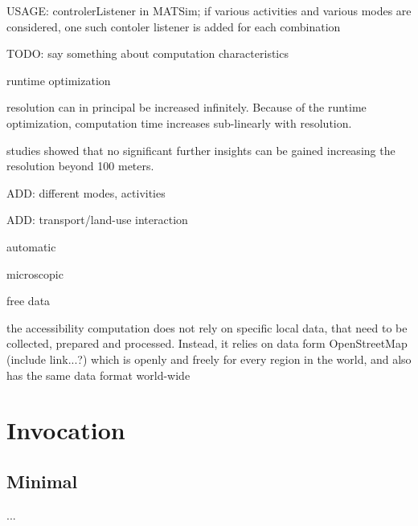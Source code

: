 USAGE: controlerListener in MATSim; if various activities and various modes are considered, one such contoler listener is added for each combination


TODO: say something about computation characteristics

runtime optimization

resolution can in principal be increased infinitely. Because of the runtime optimization, computation time increases sub-linearly with resolution.

studies showed that no significant further insights can be gained increasing the resolution beyond 100 meters.

ADD: different modes, activities

ADD: transport/land-use interaction

automatic

microscopic

free data

the accessibility computation does not rely on specific local data, that need to be collected, prepared and processed. Instead, it relies on data form OpenStreetMap (include link...?) which is openly and freely for every region in the world, and also has the same data format world-wide










\section{Invocation}

\subsection{Minimal}

...



